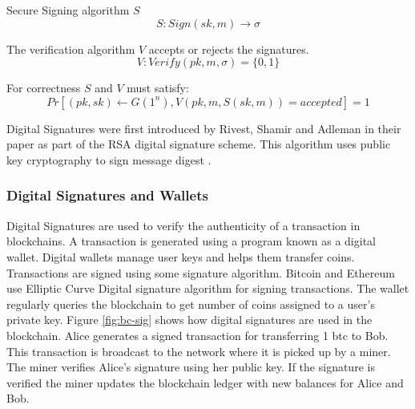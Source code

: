 Secure Signing algorithm $S$
\begin{equation}
S:Sign(sk,m) \rightarrow \sigma
\end{equation}
 
The verification algorithm $V$ accepts or rejects the signatures.
\begin{equation} 
V:Verify(pk,m,\sigma)=\{0,1\}  
\end{equation}
 
For correctness $S$ and $V$ must satisfy:
 \begin{equation}
  Pr [ (pk, sk) \leftarrow G(1^n), V( pk, m, S(sk, m) ) = accepted ] = 1 
 \end{equation}
 
Digital Signatures were first introduced by Rivest, Shamir and Adleman in their paper \cite{Rivest:1978:MOD:359340.359342} as part of the RSA digital signature scheme. This algorithm uses public key cryptography to sign message digest \cite{Rivest:1978:MOD:359340.359342}. 
\clearpage
\subsubsection{Digital Signatures and Wallets}
Digital Signatures are used to verify the authenticity of a transaction in blockchains. A transaction is generated using a program known as  a digital wallet. Digital wallets manage user keys and helps them transfer coins. Transactions are signed using some signature algorithm. Bitcoin and Ethereum use Elliptic Curve Digital signature algorithm for signing transactions. The wallet regularly queries the blockchain to get number of coins assigned to a user's private key. Figure \ref{fig:bc-sig} shows how digital signatures are used in the blockchain. Alice generates a signed transaction for transferring 1 btc to Bob. This transaction is broadcast to the network where it is picked up by a miner. The miner verifies Alice’s signature using her public key. If the signature is verified the miner updates the blockchain ledger with new balances for Alice and Bob.

